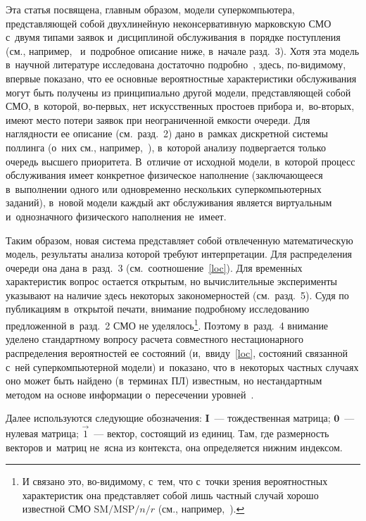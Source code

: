 \begin{multicols}{2}
Эта статья посвящена, главным образом, модели суперкомпьютера, представляющей 
собой двухлинейную
неконсервативную марковскую СМО с~двумя типами заявок и~дисциплиной обслуживания
в~порядке поступления (см., например,~\cite{tlm} и~подробное описание ниже, в~начале разд.~3).
Хотя эта модель в~научной литературе исследована достаточно подробно~\cite{ee1,o1,o2,o3,lg1,ssk,ee4,chak,tlm,mor22,melikov,unwin,afanaseva19,grosof},
здесь, по-ви\-ди\-мо\-му, впервые показано, что ее основные вероятностные 
характеристики обслуживания могут быть получены из принципиально другой модели,
представляющей собой СМО, в~которой, во-пер\-вых, нет
искусственных простоев прибора и,~во-вто\-рых, имеют место потери заявок
при неограниченной емкости очереди. Для наглядности ее описание
(см.\ разд.~2) дано в~рамках дискретной системы поллинга (о~них см., например,~\cite{viii}),
в~которой анализу подвергается только очередь высшего приоритета.
В~отличие от исходной модели, в~которой процесс обслуживания имеет конкретное физическое наполнение
(заключающееся в~выполнении одного или одновременно нескольких суперкомпьютерных
заданий), в~новой модели каждый акт обслуживания является виртуальным
и~однозначного физического наполнения не~имеет. 

Таким образом,
новая сис\-те\-ма пред\-став\-ля\-ет собой отвлеченную математическую
модель, результаты анализа которой требуют интерпретации.
Для распределения очереди она дана в~разд.~3 (см.\ соотношение~\eqref{loc}).
Для временн$\acute{\mbox{ы}}$х характеристик вопрос остается открытым,
но вы\-чис\-ли\-тель\-ные эксперименты указывают на наличие здесь
некоторых закономерностей (см.\ разд.~5).
Судя по публикациям в~открытой печати, внимание подробному исследованию
предложенной в~разд.~2 СМО не уделялось\footnote{И связано это, во-видимому,
с~тем, что с~точки зрения вероятностных характеристик она представляет
собой лишь частный случай хорошо известной СМО $\mathrm{SM}/\mathrm{MSP}/n/r$ (см.,
например,~\cite{nn1, nn3}).}. Поэтому в~разд.~4 внимание уделено
стандартному вопросу расчета совместного нестационарного
распределения вероятностей ее состояний (и,~ввиду~\eqref{loc}, состояний
связанной с~ней суперкомпьютерной модели) и~показано,
что в~некоторых частных случаях оно может быть найдено
(в~терминах ПЛ) известным, но нестандартным методом 
на основе информации о~пересечении уровней~\cite{zhang}.

Далее используются следующие обозначения: $\mathbf{I}$~--- тождественная мат\-ри\-ца;
$\mathbf{0}$~--- нулевая мат\-ри\-ца; $\vec 1$~--- вектор, состоящий из единиц.
Там, где раз\-мер\-ность векторов и~мат\-риц не~ясна из контекста, она
определяется нижним индексом.



\end{multicols}
